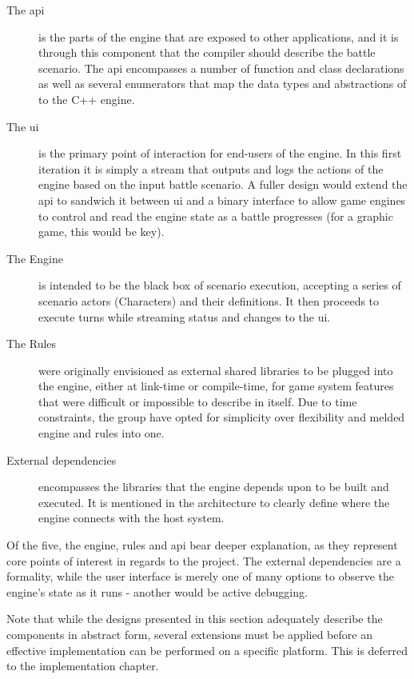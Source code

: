 \begin{description}
	\item[The \ac{api}] is the parts of the engine that are exposed to other applications, and it is through this component that the compiler should describe the battle scenario. The \ac{api} encompasses a number of function and class declarations as well as several enumerators that map the data types and abstractions of \langname{} to the C++ engine.
	\item[The \ac{ui}] is the primary point of interaction for end-users of the engine. In this first iteration it is simply a stream that outputs and logs the actions of the engine based on the input battle scenario. A fuller design would extend the \ac{api} to sandwich it between \ac{ui} and a binary interface to allow game engines to control and read the engine state as a battle progresses (for a graphic game, this would be key).
	\item[The Engine] is intended to be the black box of scenario execution, accepting a series of scenario actors (Characters) and their definitions. It then proceeds to execute turns while streaming status and changes to the \ac{ui}.
	\item[The Rules] were originally envisioned as external shared libraries to be plugged into the engine, either at link-time or compile-time, for game system features that were difficult or impossible to describe in \langname{} itself. Due to time constraints, the group have opted for simplicity over flexibility and melded engine and rules into one. 
	\item[External dependencies] encompasses the libraries that the engine depends upon to be built and executed. It is mentioned in the architecture to clearly define where the \langname{} engine connects with the host system.
\end{description}

Of the five, the engine, rules and \ac{api} bear deeper explanation, as they represent core points of interest in regards to the project. The external dependencies are a formality, while the user interface is merely one of many options to observe the engine's state as it runs - another would be active debugging.

Note that while the designs presented in this section adequately describe the components in abstract form, several extensions must be applied before an effective implementation can be performed on a specific platform. This is deferred to the implementation chapter.

